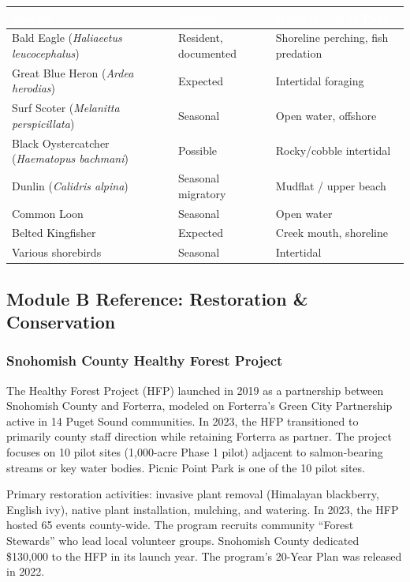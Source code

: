 \documentclass[11pt,letterpaper]{article}
\newcommand{\tableheader}[1]{\textbf{\sffamily\textcolor{white}{#1}}}
\begin{document}
\begin{center}
\begin{tabularx}{\textwidth}{L{4cm}L{3cm}X}
\toprule
{}
\tableheader{Species} & \tableheader{Status} & \tableheader{Habitat Use at Park} \\
\midrule
Bald Eagle (\textit{Haliaeetus leucocephalus}) & Resident, documented & Shoreline perching, fish predation \\
Great Blue Heron (\textit{Ardea herodias}) & Expected & Intertidal foraging \\
Surf Scoter (\textit{Melanitta perspicillata}) & Seasonal & Open water, offshore \\
Black Oystercatcher (\textit{Haematopus bachmani}) & Possible & Rocky/cobble intertidal \\
Dunlin (\textit{Calidris alpina}) & Seasonal migratory & Mudflat / upper beach \\
Common Loon & Seasonal & Open water \\
Belted Kingfisher & Expected & Creek mouth, shoreline \\
Various shorebirds & Seasonal & Intertidal \\
\bottomrule
\end{tabularx}
\end{center}

\subsection{Module B Reference: Restoration \& Conservation}

\subsubsection{Snohomish County Healthy Forest Project}

The Healthy Forest Project (HFP) launched in 2019 as a partnership between Snohomish County and Forterra, modeled on Forterra's Green City Partnership active in 14 Puget Sound communities. In 2023, the HFP transitioned to primarily county staff direction while retaining Forterra as partner. The project focuses on 10 pilot sites (1,000-acre Phase 1 pilot) adjacent to salmon-bearing streams or key water bodies. Picnic Point Park is one of the 10 pilot sites.

Primary restoration activities: invasive plant removal (Himalayan blackberry, English ivy), native plant installation, mulching, and watering. In 2023, the HFP hosted 65 events county-wide. The program recruits community ``Forest Stewards'' who lead local volunteer groups. Snohomish County dedicated \$130,000 to the HFP in its launch year. The program's 20-Year Plan was released in 2022.
\end{document}
